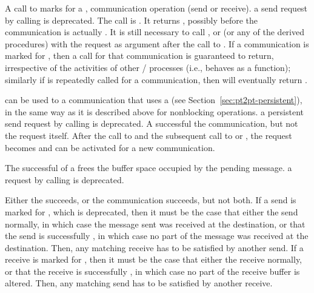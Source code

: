 A call to  marks for  a ,
communication operation (send or receive).
 a send request by calling  is deprecated.
The  call is
. It returns , possibly before the
communication is actually .
It is still necessary to call ,
 or  (or any of the derived procedures)
with the  request as argument after the call to .
If a communication is marked for , then a 
call for that communication is guaranteed to return, irrespective of
the activities of other \MPI/ processes (i.e.,  behaves as a
 function); similarly if  is
repeatedly called for a  communication,
then  will eventually return .

 can be used to  a communication that uses
a  (see Section~\ref{sec:pt2pt-persistent}), in
the same way as it is described above for nonblocking operations.
 a persistent send request by calling  is deprecated.
A successful  
the  communication, but not the request itself.  After the call to
 and the subsequent call to  or
, the request becomes  and
can be activated for a new communication.

The successful
 of a  frees the buffer space occupied by
the pending message.
 a  request by calling  is deprecated.

Either the  succeeds, or the communication succeeds, but
not both.
If a send is marked for , which is deprecated, then it must be the case that
either the send  normally, in which case the
message sent was received at the destination, or that the send is
successfully
, in which case no part of the message was received at the
destination.  Then, any matching receive has to be satisfied by another send.
If a receive is marked for , then it must be the case that
either the receive  normally, or that the receive is
successfully , in which case no part of the receive buffer
is altered.  Then, any matching send has to be satisfied by another receive.

